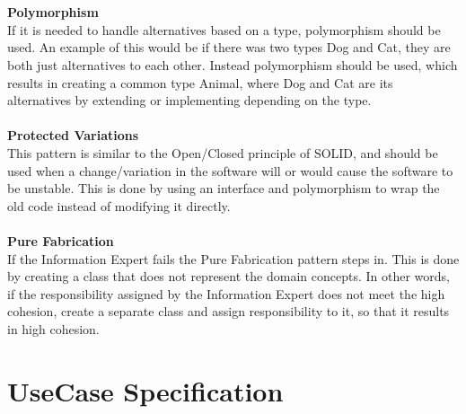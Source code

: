 \\
\\
\textbf{Polymorphism}
\\
If it is needed to handle alternatives based on a type, polymorphism should be used. An example of this would be if there was two types Dog and Cat, they are both just alternatives to each other. Instead polymorphism should be used, which results in creating a common type Animal, where Dog and Cat are its alternatives by extending or implementing depending on the type.
\\
\\
\textbf{Protected Variations}
\\
This pattern is similar to the Open/Closed principle of SOLID, and should be used when
a change/variation in the software will or would cause the software to be unstable. This is done by using an interface and polymorphism to wrap the old code instead of modifying it directly.
\\
\\
\textbf{Pure Fabrication}
\\
If the Information Expert fails the Pure Fabrication pattern steps in. This is done by creating a class that does not represent the domain concepts. In other words, if the responsibility assigned by the Information Expert does not meet the high cohesion, create a separate class and assign responsibility to it, so that it results in high cohesion.



\section {UseCase Specification}


